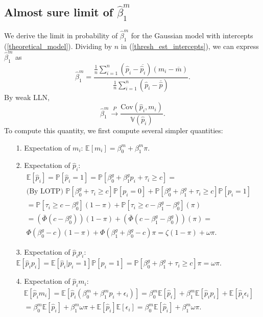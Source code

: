 \documentclass[12pt]{article}
\begin{document}
\begin{appendices}
\begin{refsection}
		\subsection{Almost sure limit of $\hat{\beta}^m_1$}\label{sec:convergence}
		
		We derive the limit in probability of $\hat{\beta}^m_1$ for the Gaussian model with intercepts (\ref{theoretical_model}). Dividing by $n$ in (\ref{thresh_est_intercepts}), we can express $\hat{\beta}^m_1$ as
		$$ \hat{\beta}^m_1 = \frac{ \frac{1}{n} \sum_{i=1}^n ( \hat{p}_i - \overline{\hat{p}_i})(m_i - \overline{m})}{ \frac{1}{n} \sum_{i=1}^n (\hat{p}_i - \overline{\hat{p}})}.$$ By weak LLN,
		$$ \hat{\beta}^m_1 \xrightarrow{P} \frac{\textrm{Cov}(\hat{p}_i, m_i)}{\mathbb{V}\left(\hat{p}_i\right)}.$$ To compute this quantity, we first compute several simpler quantities:
		\begin{itemize}
			\item[1.] Expectation of $m_i$: $\mathbb{E}[m_i] = \beta^m_0 + \beta^m_1\pi.$
			\item[2.] Expectation of $\hat{p}_i$: \begin{multline*}
			\mathbb{E}[\hat{p}_i] = \mathbb{P}\left[\hat{p}_i = 1\right] = \mathbb{P}\left[\beta^g_0 + \beta^g_1 p_i + \tau_i \geq c \right] = \\ \textrm{(By LOTP) } \mathbb{P}\left[ \beta^g_0 + \tau_i \geq c \right]\mathbb{P}\left[p_i = 0\right] + \mathbb{P}\left[ \beta^g_0 + \beta^g_1 + \tau_i \geq c \right] \mathbb{P}[p_i = 1] \\ = \mathbb{P}\left[ \tau_i \geq c - \beta^g_0\right](1- \pi) + \mathbb{P}\left[ \tau_i \geq c - \beta^g_1 - \beta^g_0 \right](\pi) \\ =  \left(\bar{\Phi}(c - \beta^g_0) \right) (1 - \pi) + \left( \bar{\Phi}(c - \beta^g_1 - \beta^g_0) \right)(\pi) = \\  \Phi(\beta^g_0 - c) (1-\pi) + \Phi(\beta^g_1 + \beta^g_0 - c) \pi = \zeta(1-\pi) + \omega \pi.
			\end{multline*}
			\item[3.] Expectation of $\hat{p}_i p_i$: 
			$\mathbb{E}\left[ \hat{p}_i p_i \right] = \mathbb{E}\left[\hat{p}_i | p_i = 1 \right] \mathbb{P}\left[ p_i =1 \right] = \mathbb{P}\left[ \beta^g_0 + \beta^g_1 + \tau_i \geq c \right] \pi = \omega \pi.$
			\item[4.] Expectation of $\hat{p}_i m_i$:
			\begin{multline*}
			\mathbb{E}\left[\hat{p}_i m_i\right] = \mathbb{E}[\hat{p}_i (\beta^m_0 + \beta^m_1 p_i + \epsilon_i)] = \beta^m_0 \mathbb{E}\left[\hat{p}_i\right] + \beta^m_1 \mathbb{E}\left[\hat{p}_i p_i\right] + \mathbb{E}[\hat{p}_i \epsilon_i] \\ = \beta^m_0 \mathbb{E}[\hat{p}_i] + \beta^m_1 \omega \pi + \mathbb{E}[\hat{p}_i] \mathbb{E}[\epsilon_i] = \beta^m_0 \mathbb{E}[\hat{p}_i] + \beta^m_1 \omega \pi.

\end{multline*}
\end{itemize}
\end{refsection}
\end{appendices}
\end{document}
